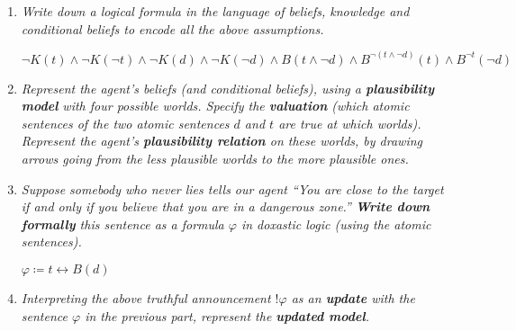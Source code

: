 \documentclass[leqno]{article}
\begin{document}
\begin{enumerate}
    \item \textit{Write down a logical formula in the language of beliefs,
    knowledge and conditional beliefs to encode all the above assumptions.}
    
    $\neg K(t) \land \neg K(\neg t) \land \neg K(d) \land \neg K(\neg d) \land
    B(t \land \neg d) \land B^{\neg (t \land \neg d)}(t) \land 
    B^{\neg t}(\neg d)$

    \item \textit{Represent the agent's beliefs (and conditional beliefs),
    using a \textbf{plausibility model} with four possible worlds. Specify the 
    \textbf{valuation} (which atomic sentences of the two atomic sentences $d$ 
    and $t$ are true at which worlds). Represent the agent's 
    \textbf{plausibility relation} on these worlds, by drawing arrows going 
    from the less plausible worlds to the more plausible ones.}

    \begin{center}
    \end{center}

    \item \textit{Suppose somebody who never lies tells our agent ``You are 
    close to the target if and only if you believe that you are in a dangerous 
    zone.'' \textbf{Write down formally} this sentence as a formula $\varphi$ 
    in doxastic logic (using the atomic sentences).}

    $\varphi \coloneqq t \leftrightarrow B(d)$

    \item \textit{Interpreting the above truthful announcement $!\varphi$ as an
     \textbf{update} with the sentence $\varphi$ in the previous part, 
    represent the \textbf{updated model}.}


\end{enumerate}
\end{document}
